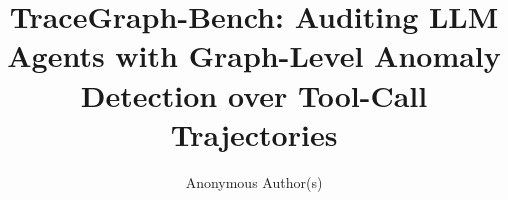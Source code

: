 \documentclass[sigconf,review,anonymous]{acmart}
\title[TraceGraph-Bench: Graph-Level Anomaly Detection over Agent Trajectories]{TraceGraph-Bench: Auditing LLM Agents with Graph-Level Anomaly Detection over Tool-Call Trajectories}
\author{Anonymous Author(s)}
\begin{document}


\maketitle



\FloatBarrier

\FloatBarrier

\FloatBarrier

\FloatBarrier

\FloatBarrier

\FloatBarrier

\FloatBarrier

\FloatBarrier






\end{document}
